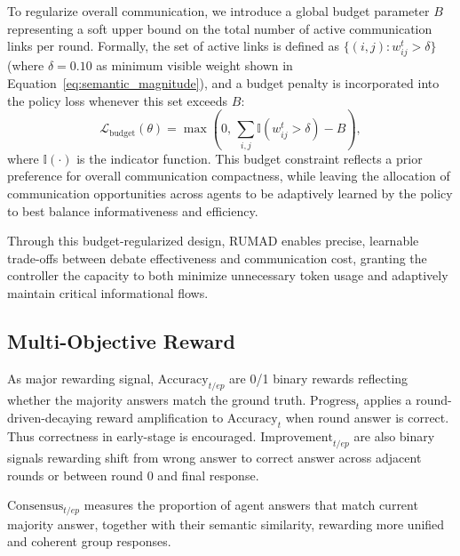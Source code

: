 To regularize overall communication, we introduce a global budget parameter $B$ representing a soft upper bound on the total number of active communication links per round. Formally, the set of active links is defined as $\{ (i,j) : w_{ij}^t > \delta \}$(where $\delta=0.10$ as minimum visible weight shown in Equation~\ref{eq:semantic_magnitude}), and a budget penalty is incorporated into the policy loss whenever this set exceeds $B$:
\begin{equation}
\mathcal{L}_\mathrm{budget}(\theta) = \max\left(0,\, \sum_{i,j} \mathbb{I}(w_{ij}^t > \delta) - B \right),
\label{eq:Loss_budget}
\end{equation}
where $\mathbb{I}(\cdot)$ is the indicator function.  This budget constraint reflects a prior preference for overall communication compactness, while leaving the allocation of communication opportunities across agents to be adaptively learned by the policy to best balance informativeness and efficiency.

Through this budget-regularized design, RUMAD enables precise, learnable trade-offs between debate effectiveness and communication cost, granting the controller the capacity to both minimize unnecessary token usage and adaptively maintain critical informational flows.


\subsection{Multi-Objective Reward}

As major rewarding signal, $\mathrm{Accuracy}_{t/{ep}}$ are 0/1 binary rewards reflecting whether the majority answers match the ground truth. 
$\mathrm{Progress}_t$ applies a round-driven-decaying reward amplification to $\mathrm{Accuracy}_t$ when round answer is correct. Thus correctness in early-stage is encouraged. 
$\mathrm{Improvement}_{t/{ep}}$ are also binary signals rewarding shift from wrong answer to correct answer across adjacent rounds or between round 0 and final response.

$\mathrm{Consensus}_{t/{ep}}$ measures the proportion of agent answers that match current majority answer, together with their semantic similarity, rewarding more unified and coherent group responses.

